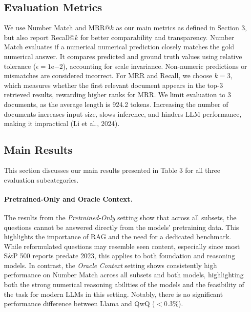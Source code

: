 \documentclass[10pt]{article}
\begin{document}
\subsection{Evaluation Metrics}
We use Number Match and MRR@$k$ as our main metrics as defined in Section 3, but also report Recall@$k$ for better comparability and transparency. Number Match evaluates if a numerical numerical prediction closely matches the gold numerical answer. It compares predicted and ground truth values using relative tolerance ($\epsilon=1\mathrm{e}{-2}$), accounting for scale invariance. Non-numeric predictions or mismatches are considered incorrect. For MRR and Recall, we choose $k=3$, which measures whether the first relevant document appears in the top-3 retrieved results, rewarding higher ranks for MRR. We limit evaluation to 3 documents, as the average length is 924.2 tokens. Increasing the number of documents increases input size, slows inference, and hinders LLM performance, making it impractical (Li et al., 2024).

\subsection{Main Results}
This section discusses our main results presented in Table 3 for all three evaluation subcategories.

\paragraph{Pretrained-Only and Oracle Context.} The results from the \textit{Pretrained-Only} setting show that across all subsets, the questions cannot be answered directly from the models’ pretraining data. This highlights the importance of RAG and the need for a dedicated benchmark. While reformulated questions may resemble seen content, especially since most S\&P 500 reports predate 2023, this applies to both foundation and reasoning models. In contrast, the \textit{Oracle Context} setting shows consistently high performance on Number Match across all subsets and both models, highlighting both the strong numerical reasoning abilities of the models and the feasibility of the task for modern LLMs in this setting. Notably, there is no significant performance difference between Llama and QwQ ($<0.3\%$).
\end{document}
